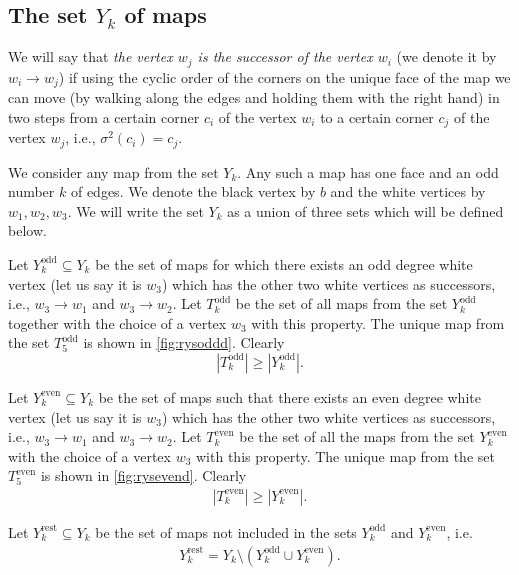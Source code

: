 \documentclass[submission]{FPSAC2021}
\DeclareMathOperator{\odd}{odd}
\DeclareMathOperator{\even}{even}
\DeclareMathOperator{\rest}{rest}
\newcommand{\nast}
{
	\sigma
}
\begin{document}
\subsection{The set $Y_k$ of maps}

We will say that \emph{the vertex $w_j$ is the successor of the vertex
$w_i$} (we denote it by $w_i \rightarrow w_j$) 
if using the  cyclic order of the corners on the unique face of the map
we
can move (by walking along the edges and holding them with the right hand)
in two steps from a certain corner $c_i$ of the vertex $w_i$ to a certain
corner $c_j$ of the vertex $w_j$, i.e., $\nast^2(c_i)=c_j$. 

We consider any map from the set $Y_k$. Any such a map has one
face and an odd number $k$ of edges. We denote the black vertex by $b$
and  the white vertices by $w_1, w_2, w_3$. We will write the set $Y_k$ as
a union of three sets which will be defined below.

Let $Y_{k}^{\odd}\subseteq Y_k$ be the set of maps for which there exists an
odd degree white vertex (let us say it is $w_3$) which has the other two white vertices 
as successors, i.e., $w_3\rightarrow w_1$ and $w_3\rightarrow w_2$.
Let $T_k^{\odd}$ be the set of all maps from the set $Y_k^{\odd}$ 
together with the choice of a vertex $w_3$ with this property. 
The unique map from the set $T_{5}^{\odd}$ is shown in \cref{fig:rysoddd}. Clearly
\begin{equation}
\label{ineqodd}
|T_{k}^{\odd}| \geq |Y_{k}^{\odd}|.
\end{equation}

Let $Y_{k}^{\even}\subseteq Y_k$ be the set of maps such that there
exists an even degree white vertex (let us say it is $w_3$) which has the other 
two white vertices as successors, i.e., $w_3\rightarrow w_1$ and $w_3\rightarrow w_2$. 
Let $T_k^{\even}$ be the set of all the maps from the set $Y_k^{\even}$ with the choice 
of a vertex $w_3$ with this property.  
The unique map from the set $T_{5}^{\even}$ is shown in \cref{fig:rysevend}.
Clearly
\begin{align}
\label{ineqeven}
|T_{k}^{\even}| \geq |Y_{k}^{\even}|.
\end{align}

Let $Y_{k}^{\rest}\subseteq Y_k$ be the set of maps not included in the
sets $Y_{k}^{\odd}$ and $Y_{k}^{\even}$, i.e. 
\begin{align}
\label{yrestdef}
Y_{k}^{\rest}=Y_k \setminus (Y_{k}^{\odd} \cup Y_{k}^{\even}).
\end{align}
\end{document}
